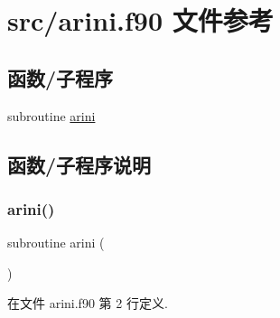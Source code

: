 \hypertarget{arini_8f90}{}\section{src/arini.f90 文件参考}
\label{arini_8f90}
\subsection*{函数/子程序}
\begin{DoxyCompactItemize}
\item 
subroutine \mbox{\hyperlink{arini_8f90_a79db49cba428fb8b4e312299e29f407e}{arini}}
\end{DoxyCompactItemize}


\subsection{函数/子程序说明}
\mbox{\label{arini_8f90_a79db49cba428fb8b4e312299e29f407e}} 
\subsubsection{\texorpdfstring{arini()}{arini()}}
{\footnotesize\ttfamily subroutine arini (\begin{DoxyParamCaption}{ }\end{DoxyParamCaption})}



在文件 arini.\+f90 第 2 行定义.

